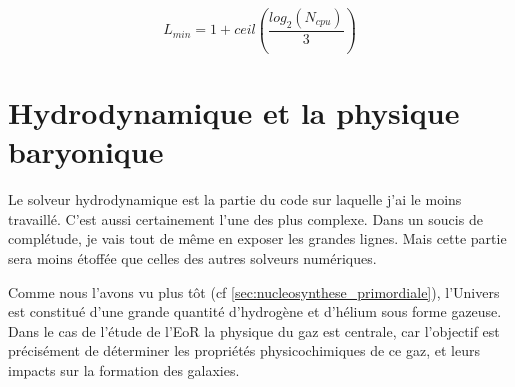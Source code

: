 \begin{equation}
L_{min} = 1 + ceil \left(\frac{log_2(N_{cpu})}{3}  \right) 
\end{equation}


%
%


%




\clearpage
\section{Hydrodynamique et la physique baryonique}


Le solveur hydrodynamique est la partie du code sur laquelle j'ai le moins travaillé.
C'est aussi certainement l'une des plus complexe.
Dans un soucis de complétude, je vais tout de même en exposer les grandes lignes.
Mais cette partie sera moins étoffée que celles des autres solveurs numériques.

Comme nous l'avons vu plus tôt (cf \ref{sec:nucleosynthese_primordiale}), l'Univers est constitué d'une grande quantité d'hydrogène et d'hélium sous forme gazeuse.
Dans le cas de l'étude de l'\ac{EoR} la physique du gaz est centrale, car l'objectif est précisément de déterminer les propriétés physicochimiques de ce gaz, et leurs impacts sur la formation des galaxies.

